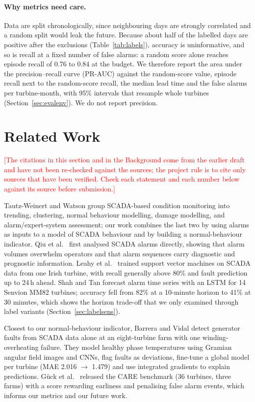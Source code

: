 \documentclass[12pt,a4paper]{article}
\newcommand{\tbc}[1]{\textcolor{red}{[#1]}}
\begin{document}
	\paragraph{Why metrics need care.} Data are split chronologically, since neighbouring days are strongly correlated and a random split would leak the future. Because about half of the labelled days are positive after the exclusions (Table~\ref{tab:labels}), accuracy is uninformative, and so is recall at a fixed number of false alarms: a random score alone reaches episode recall of 0.76 to 0.84 at the budget. We therefore report the area under the precision--recall curve (PR-AUC) against the random-score value, episode recall next to the random-score recall, the median lead time and the false alarms per turbine-month, with 95\% intervals that resample whole turbines (Section~\ref{sec:evalenv}). We do not report precision.

	\section{Related Work}

	\tbc{The citations in this section and in the Background come from the earlier draft and have not been re-checked against the sources; the project rule is to cite only sources that have been verified. Check each statement and each number below against its source before submission.}

	Tautz-Weinert and Watson \cite{tautzweinert2017} group SCADA-based condition monitoring into trending, clustering, normal behaviour modelling, damage modelling, and alarm/expert-system assessment; our work combines the last two by using alarms as inputs to a model of SCADA behaviour and by building a normal-behaviour indicator. Qiu et al.\ \cite{qiu2012} first analysed SCADA alarms directly, showing that alarm volumes overwhelm operators and that alarm sequences carry diagnostic and prognostic information. Leahy et al.\ \cite{leahy2018} trained support vector machines on SCADA data from one Irish turbine, with recall generally above 80\% and fault prediction up to 24\,h ahead. Shah and Tan \cite{shah2025} forecast alarm time series with an LSTM for 14 Senvion MM82 turbines; accuracy fell from 82\% at a 10-minute horizon to 41\% at 30 minutes, which shows the horizon trade-off that we only examined through label variants (Section~\ref{sec:labelsens}).

	Closest to our normal-behaviour indicator, Barrera and Vidal \cite{barrera2026} detect generator faults from SCADA data alone at an eight-turbine farm with one winding-overheating failure. They model healthy phase temperatures using Gramian angular field images and CNNs, flag faults as deviations, fine-tune a global model per turbine (MAE 2.016 $\rightarrow$ 1.479) and use integrated gradients to explain predictions. G\"uck et al.\ \cite{gueck2024} released the CARE benchmark (36 turbines, three farms) with a score rewarding earliness and penalising false alarm events, which informs our metrics and our future work.
\end{document}
